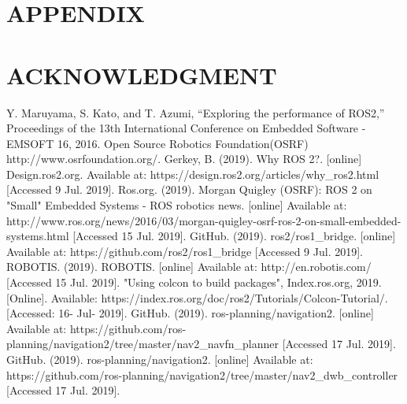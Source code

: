 \documentclass[letterpaper, 10 pt, conference]{ieeeconf}  %
\begin{document}
\section*{APPENDIX}

\section*{ACKNOWLEDGMENT}
\begin{thebibliography}{99}

 Y. Maruyama, S. Kato, and T. Azumi, “Exploring the performance of ROS2,” Proceedings of the 13th International Conference on Embedded Software - EMSOFT 16, 2016. 
 Open Source Robotics Foundation(OSRF) http://www.osrfoundation.org/.
 Gerkey, B. (2019). Why ROS 2?. [online] Design.ros2.org. Available at: https://design.ros2.org/articles/why\_ros2.html [Accessed 9 Jul. 2019].
Ros.org. (2019). Morgan Quigley (OSRF): ROS 2 on "Small" Embedded Systems - ROS robotics news. [online] Available at: http://www.ros.org/news/2016/03/morgan-quigley-osrf-ros-2-on-small-embedded-systems.html [Accessed 15 Jul. 2019].
 GitHub. (2019). ros2/ros1\_bridge. [online] Available at: https://github.com/ros2/ros1\_bridge [Accessed 9 Jul. 2019].
 ROBOTIS. (2019). ROBOTIS. [online] Available at: http://en.robotis.com/ [Accessed 15 Jul. 2019].
 "Using colcon to build packages", Index.ros.org, 2019. [Online]. Available: https://index.ros.org/doc/ros2/Tutorials/Colcon-Tutorial/. [Accessed: 16- Jul- 2019].
 GitHub. (2019). ros-planning/navigation2. [online] Available at: https://github.com/ros-planning/navigation2/tree/master/nav2\_navfn\_planner [Accessed 17 Jul. 2019].
 GitHub. (2019). ros-planning/navigation2. [online] Available at: https://github.com/ros-planning/navigation2/tree/master/nav2\_dwb\_controller [Accessed 17 Jul. 2019].
\end{thebibliography}
\end{document}
